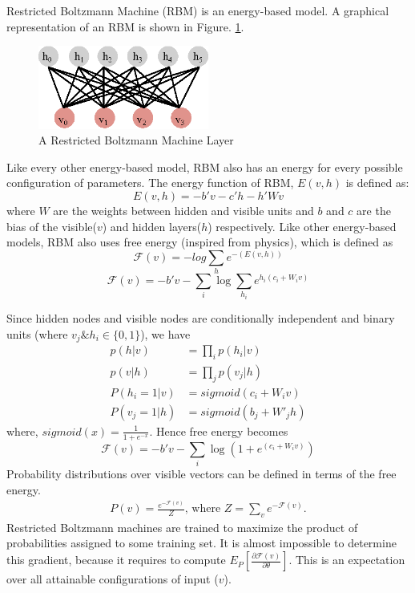 Restricted Boltzmann Machine (RBM) is an energy-based model. A graphical representation of an RBM is shown in Figure. \ref{fig:rbm_layer}.

\begin{figure}[!ht]
  \centering
  \includegraphics[width=0.5\textwidth]{./imgs/rbm.eps}
  \caption{A Restricted Boltzmann Machine Layer}
  \label{fig:rbm_layer}
\end{figure}%

Like every other energy-based model, RBM also has an energy for every possible configuration of parameters. The energy function of RBM, $E(v,h)$ is defined as: 
$$E(v,h) = - b'v - c'h - h'Wv$$
where $W$ are the weights between hidden and visible units and $b$ and $c$ are the bias of the visible($v$) and hidden layers($h$) respectively. Like other energy-based models, RBM also uses free energy (inspired from physics), which is defined as
$$\mathcal{F}(v) = -log \sum_{h}{e^{-(E(v,h))}} $$
$$\mathcal{F}(v) = - b'v - \sum_i \log \sum_{h_i} e^{h_i (c_i + W_i v)}$$

Since hidden nodes and visible nodes are conditionally independent and binary units (where $v_j \& h_i \in \{0,1\}$), we have 
\begin{align}
p(h|v) &= \prod_i p(h_i|v) \\
p(v|h) &= \prod_j p(v_j|h) \\
P(h_i=1|v) &= sigmoid(c_i + W_i v) \label{eq:rbm_layers_prob1} \\
P(v_j=1|h) &= sigmoid(b_j + W'_j h) \label{eq:rbm_layers_prob2}
\end{align}
where, $sigmoid(x)= \frac{1}{1 + e^{-x}}$. Hence free energy becomes
$$\mathcal{F}(v)= - b'v - \sum_i \log(1 + e^{(c_i + W_i v)})$$ %
Probability distributions over visible vectors can be defined in terms of the free energy.
\begin{align*}
P(v) = \frac{e^{-\mathcal{F}(v)}}{Z} \text{, where } Z=\sum_v e^{-\mathcal{F}(v)}.
\end{align*}
Restricted Boltzmann machines are trained to maximize the product of probabilities assigned to some training set. It is almost impossible to determine this gradient, because it requires to compute $E_P[\frac{\partial \mathcal{F}(v)} {\partial \theta} ]$. This is an expectation over all attainable configurations of input ($v$). \cite{hinton2010practical}

